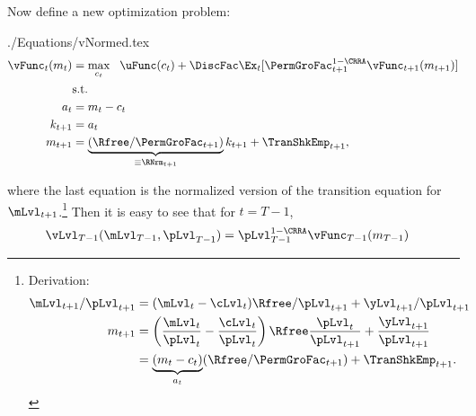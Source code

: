 \documentclass[titlepage, headings=optiontotocandhead]{\econtex}
\begin{document}
Now define a new optimization problem:
\begin{verbatimwrite}{./Equations/vNormed.tex}
  \begin{equation}\begin{gathered}\begin{aligned}
        \null{\vFunc}_{t}({m}_{t})  & = \max_{{c}_{t}} ~~ \uFunc({c}_{t})+
        {\DiscFac}\Ex_{t}[ \PermGroFac_{t+1}^{1-\CRRA}\null{\vFunc}_{t+1}({m}_{t+1})] \label{eq:vNormed}
        \\         & \text{s.t.}   \\
    {a}_{t}    & = {m}_{t}-{c}_{t}
\\  {k}_{t+1}  & = {a}_{t}                 
        \\      {m}_{t+1}  & = \underbrace{\left(\Rfree/\PermGroFac_{t+1}\right)}_{\equiv \RNrm_{t+1}}{k}_{t+1}+\TranShkEmp_{t+1},
      \end{aligned}\end{gathered}\end{equation}
\end{verbatimwrite}
\unskip
where the last equation is the normalized version of the transition equation for $\mLvl_{t+1}$.\footnote{Derivation:
  \begin{equation*}\begin{gathered}\begin{aligned}
        \mLvl_{t+1}/\pLvl_{t+1}  & = (\mLvl_{t}-\cLvl_{t})\Rfree/\pLvl_{t+1} + {\yLvl}_{t+1}/\pLvl_{t+1}
        \\      {m}_{t+1}  & = \left(\frac{\mLvl_{t}}{\pLvl_{t}} - \frac{\cLvl_{t}}{\pLvl_{t}}\right)\Rfree\frac{\pLvl_{t}}{\pLvl_{t+1}} + \frac{{\yLvl}_{t+1}}{\pLvl_{t+1}}
        \\        & = \underbrace{({m}_{t} - {c}_{t})}_{{a}_{t}}(\Rfree/\PermGroFac_{t+1}) + \TranShkEmp_{t+1}.
      \end{aligned}\end{gathered}\end{equation*}
}  Then it is easy to see that for $t=T-1$,
\begin{equation*}\begin{gathered}\begin{aligned}
      {\vLvl}_{T-1}(\mLvl_{T-1},\pLvl_{T-1})  & =  \pLvl_{T-1}^{1-\CRRA}\null{\vFunc}_{T-1}({m}_{T-1})
    \end{aligned}\end{gathered}\end{equation*}
\end{document}
